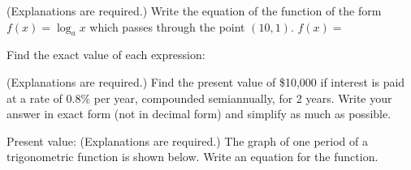 \documentclass[11pt,answers]{exam}
\begin{document}
\begin{questions}
\question[2] (Explanations are required.) Write the equation of the function of the form $\displaystyle f(x)=\log_a x$ which passes through the point $(10,1)$.
\fillwithdottedlines{0.7in}
$\displaystyle f(x)=$\dotfill 

\question Find the exact value of each expression:

\question[2] (Explanations are required.) Find the present value of \$10,000 if interest is paid at a rate of 0.8\% per year, compounded semiannually, for 2 years. Write your answer in exact form (not in decimal form) and simplify as much as possible.
\fillwithdottedlines{0.7in}

Present value:\dotfill
\question[2] (Explanations are required.) The graph of one period of a trigonometric function is shown below. Write an equation for the function.

\smallskip

\begin{minipage}[b]{0.40\textwidth}%
\end{minipage}
\begin{minipage}[b]{0.60\textwidth}%
\fillwithdottedlines{2in}


\end{minipage}
\end{questions}
\end{document}
